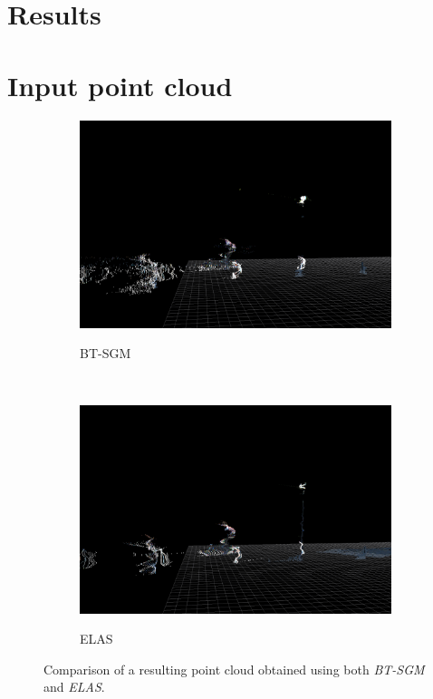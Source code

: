 \section{Results}\label{ch:chapter05_02}

\section{Input point cloud}\label{ch:chapter05_02_01}
\begin{figure}[th]
        \centering
        \begin{subfigure}[b]{0.475\textwidth}
                \centering
                \caption{BT-SGM}
                \includegraphics[width=\textwidth]{btsgm}\label{fig:cp05_bt_sgm}
        \end{subfigure}%
        ~ 
        \begin{subfigure}[b]{0.475\textwidth}
                \centering
                \caption{ELAS}
                \includegraphics[width=\textwidth]{elas}\label{fig:cp05_elas}                
        \end{subfigure}%
        \caption{Comparison of a resulting point cloud obtained using both \emph{BT-SGM} and \emph{ELAS}.}\label{fig:cp05_comparison_bt_sgm_vs_elas}
\end{figure}


